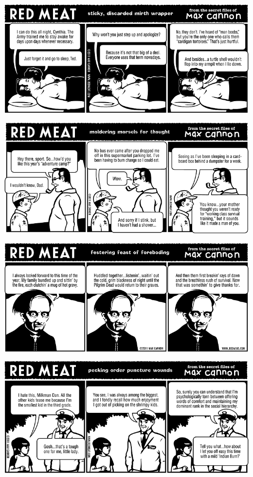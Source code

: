 \documentclass[a4paper,twoside,11pt]{article}
\begin{document}
\includegraphics[width=\textwidth]{redmeat_2011-11-15.png}



\includegraphics[width=\textwidth]{redmeat_2011-11-22.png}



\includegraphics[width=\textwidth]{redmeat_2011-11-29.png}



\includegraphics[width=\textwidth]{redmeat_2011-12-06.png}
\end{document}
